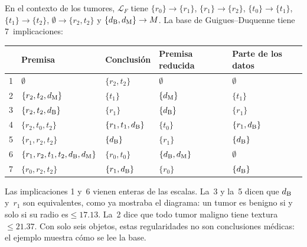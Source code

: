 \begin{ejemplo}\label{ej:base}
En el contexto de los tumores, $\mathcal{L}_F$ tiene $\{r_0\} \to \{r_1\}$, $\{r_1\} \to \{r_2\}$, $\{t_0\} \to \{t_1\}$, $\{t_1\} \to \{t_2\}$, $\emptyset \to \{r_2, t_2\}$ y $\{d_{\mathrm{B}}, d_{\mathrm{M}}\} \to M$. La base de Guigues--Duquenne tiene 7~implicaciones:
\begin{center}
\small
\begin{tabular}{rllll}
  \toprule
  & Premisa & Conclusión & Premisa reducida & Parte de los datos \\
  \midrule
  1 & $\emptyset$ & $\{r_2, t_2\}$ & $\emptyset$ & $\emptyset$ \\
  2 & $\{r_2, t_2, d_{\mathrm{M}}\}$ & $\{t_1\}$ & $\{d_{\mathrm{M}}\}$ & $\{t_1\}$ \\
  3 & $\{r_2, t_2, d_{\mathrm{B}}\}$ & $\{r_1\}$ & $\{d_{\mathrm{B}}\}$ & $\{r_1\}$ \\
  4 & $\{r_2, t_0, t_2\}$ & $\{r_1, t_1, d_{\mathrm{B}}\}$ & $\{t_0\}$ & $\{r_1, d_{\mathrm{B}}\}$ \\
  5 & $\{r_1, r_2, t_2\}$ & $\{d_{\mathrm{B}}\}$ & $\{r_1\}$ & $\{d_{\mathrm{B}}\}$ \\
  6 & $\{r_1, r_2, t_1, t_2, d_{\mathrm{B}}, d_{\mathrm{M}}\}$ & $\{r_0, t_0\}$ & $\{d_{\mathrm{B}}, d_{\mathrm{M}}\}$ & $\emptyset$ \\
  7 & $\{r_0, r_2, t_2\}$ & $\{r_1, d_{\mathrm{B}}\}$ & $\{r_0\}$ & $\{d_{\mathrm{B}}\}$ \\
  \bottomrule
\end{tabular}
\end{center}
Las implicaciones 1 y~6 vienen enteras de las escalas. La~3 y la~5 dicen que $d_{\mathrm{B}}$ y~$r_1$ son equivalentes, como ya mostraba el diagrama: un tumor es benigno si y solo si su radio es${}\le 17.13$. La~2 dice que todo tumor maligno tiene textura${}\le 21.37$. Con solo seis objetos, estas regularidades no son conclusiones médicas: el ejemplo muestra cómo se lee la base.
\end{ejemplo}
